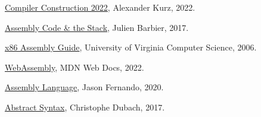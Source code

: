 \documentclass{article}
\theoremstyle{theorem}
\theoremstyle{definition}
\theoremstyle{remark}
\begin{document}
\begin{thebibliography}{99}
 \href{https://github.com/alexhkurz/compiler-construction-2022/}{Compiler Construction 2022}, Alexander Kurz, 2022.

 \href{https://blog.holbertonschool.com/hack-virtual-memory-stack-registers-assembly-code/}{Assembly Code \& the Stack}, Julien Barbier, 2017.

 \href{https://www.cs.virginia.edu/~evans/cs216/guides/x86.html}{x86 Assembly Guide}, University of Virginia Computer Science, 2006.

 \href{https://developer.mozilla.org/en-US/docs/WebAssembly}{WebAssembly}, MDN Web Docs, 2022.

 \href{https://www.investopedia.com/terms/a/assembly-language.asp}{Assembly Language}, Jason Fernando, 2020.

 \href{https://www.inf.ed.ac.uk/teaching/courses/ct/17-18/slides/7-ast.pdf}{Abstract Syntax}, Christophe Dubach, 2017.


\end{thebibliography}
\end{document}

